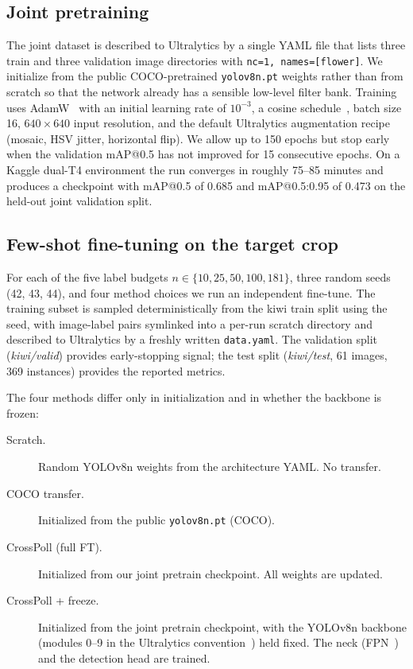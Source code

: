 \subsection{Joint pretraining}

The joint dataset is described to Ultralytics by a single YAML file that lists three train and three validation image directories with \texttt{nc=1, names=[flower]}. We initialize from the public COCO-pretrained \texttt{yolov8n.pt} weights rather than from scratch so that the network already has a sensible low-level filter bank. Training uses AdamW~\cite{loshchilov2019adamw} with an initial learning rate of $10^{-3}$, a cosine schedule~\cite{loshchilov2017sgdr}, batch size 16, $640 \times 640$ input resolution, and the default Ultralytics augmentation recipe (mosaic, HSV jitter, horizontal flip). We allow up to 150 epochs but stop early when the validation mAP@0.5 has not improved for 15 consecutive epochs. On a Kaggle dual-T4 environment the run converges in roughly 75--85 minutes and produces a checkpoint with mAP@0.5 of 0.685 and mAP@0.5{:}0.95 of 0.473 on the held-out joint validation split.

\subsection{Few-shot fine-tuning on the target crop}

For each of the five label budgets $n \in \{10, 25, 50, 100, 181\}$, three random seeds (42, 43, 44), and four method choices we run an independent fine-tune. The training subset is sampled deterministically from the kiwi train split using the seed, with image-label pairs symlinked into a per-run scratch directory and described to Ultralytics by a freshly written \texttt{data.yaml}. The validation split (\emph{kiwi/valid}) provides early-stopping signal; the test split (\emph{kiwi/test}, 61 images, 369 instances) provides the reported metrics.

The four methods differ only in initialization and in whether the backbone is frozen:
\begin{description}
  \item[Scratch.] Random YOLOv8n weights from the architecture YAML. No transfer.
  \item[COCO transfer.] Initialized from the public \texttt{yolov8n.pt} (COCO).
  \item[CrossPoll (full FT).] Initialized from our joint pretrain checkpoint. All weights are updated.
  \item[CrossPoll + freeze.] Initialized from the joint pretrain checkpoint, with the YOLOv8n backbone (modules 0--9 in the Ultralytics convention~\cite{gandhi2025fine}) held fixed. The neck (FPN~\cite{lin2017fpn}) and the detection head are trained.
\end{description}

